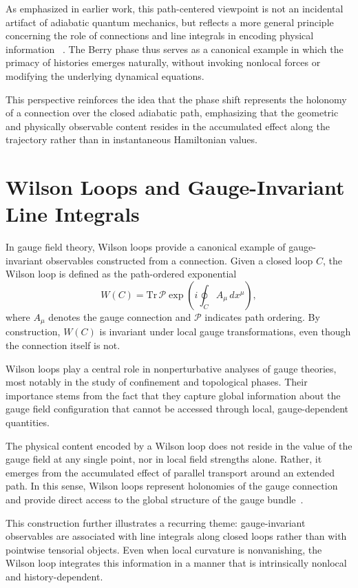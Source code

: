 \documentclass[%
 reprint,
 amsmath,amssymb,
 aps,
 prb,
]{revtex4-2}
\numberwithin{equation}{section}
\begin{document}
As emphasized in earlier work, this path-centered viewpoint is not an incidental artifact of adiabatic quantum mechanics, but reflects a more general principle concerning the role of connections and line integrals in encoding physical information ~\cite{hanamura17765409}. The Berry phase thus serves as a canonical example in which the primacy of histories emerges naturally, without invoking nonlocal forces or modifying the underlying dynamical equations.

This perspective reinforces the idea that the phase shift represents the holonomy of a connection over the closed adiabatic path, emphasizing that the geometric and physically observable content resides in the accumulated effect along the trajectory rather than in instantaneous Hamiltonian values.


\section{Wilson Loops and Gauge-Invariant Line Integrals}
\label{sec:wilson_loops_gauge_invariant}

In gauge field theory, Wilson loops provide a canonical example of gauge-invariant observables constructed from a connection. Given a closed loop $C$, the Wilson loop is defined as the path-ordered exponential
\begin{equation}
W(C) = \mathrm{Tr}\, \mathcal{P} \exp\left( i \oint_C A_\mu \, dx^\mu \right),
\end{equation}
where $A_\mu$ denotes the gauge connection and $\mathcal{P}$ indicates path ordering. By construction, $W(C)$ is invariant under local gauge transformations, even though the connection itself is not.

Wilson loops play a central role in nonperturbative analyses of gauge theories, most notably in the study of confinement and topological phases. Their importance stems from the fact that they capture global information about the gauge field configuration that cannot be accessed through local, gauge-dependent quantities.

The physical content encoded by a Wilson loop does not reside in the value of the gauge field at any single point, nor in local field strengths alone. Rather, it emerges from the accumulated effect of parallel transport around an extended path. In this sense, Wilson loops represent holonomies of the gauge connection and provide direct access to the global structure of the gauge bundle~\cite{Nakahara2003}.

This construction further illustrates a recurring theme: gauge-invariant observables are associated with line integrals along closed loops rather than with pointwise tensorial objects. Even when local curvature is nonvanishing, the Wilson loop integrates this information in a manner that is intrinsically nonlocal and history-dependent.
\end{document}

